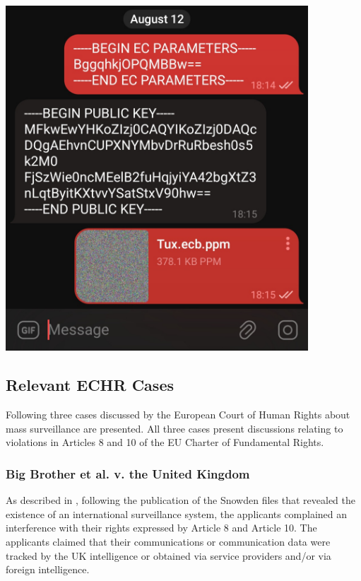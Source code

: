 \begin{minipage}{0.4\textwidth}
    \centering
    \includegraphics[keepaspectratio,width=0.85\textwidth]{05-results/img/enc_chat.jpg}
\end{minipage}

\subsection{Relevant ECHR Cases}

Following three cases discussed by the European Court of Human Rights about mass surveillance are presented. All three cases present discussions relating to violations in Articles 8 and 10 of the EU Charter of Fundamental Rights.

\subsubsection{Big Brother et al. v. the United Kingdom}

As described in \cite{big_brother}, following the publication of the Snowden files that revealed the existence of an international surveillance system, the applicants complained an interference with their rights expressed by Article 8 and Article 10. The applicants claimed that their communications or communication data were tracked by the UK intelligence or obtained via service providers and/or via foreign intelligence.

